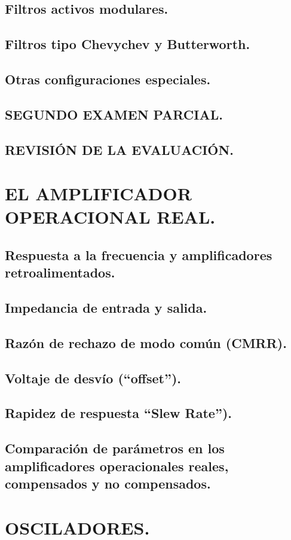\documentclass{myarticle}
\begin{document}
\subsection*{Filtros activos modulares.}
\subsection*{Filtros tipo Chevychev y Butterworth.}
\subsection*{Otras configuraciones especiales.}
\subsection*{\bf SEGUNDO EXAMEN PARCIAL.}
\subsection*{{\bf REVISIÓN DE LA EVALUACIÓN.}}
\section{ EL AMPLIFICADOR OPERACIONAL REAL.}
\subsection*{Respuesta a la frecuencia y amplificadores retroalimentados.}
\subsection*{Impedancia de entrada y salida.}
\subsection*{Razón de rechazo de modo común (CMRR).}
\subsection{Voltaje de desvío (``offset'').}
\subsection*{Rapidez de respuesta ``Slew Rate'').}
\subsection*{Comparación de parámetros en los amplificadores operacionales reales, compensados y no compensados.}
\section{ OSCILADORES.}
\end{document}
